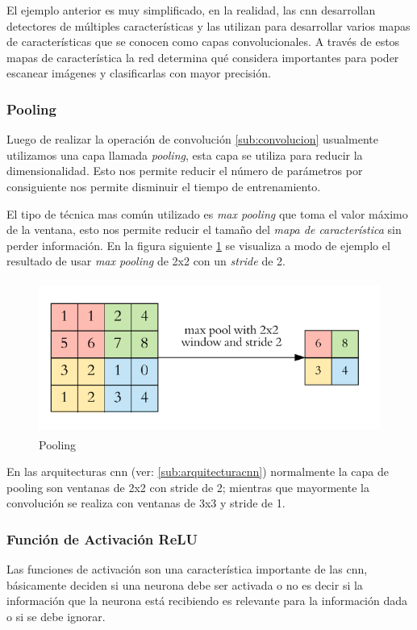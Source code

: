El ejemplo anterior es muy simplificado, en la realidad, las \ac{cnn} desarrollan detectores de múltiples características y las utilizan para desarrollar varios mapas de características que se conocen como capas convolucionales. A través de estos mapas de característica la red determina qué  considera importantes para poder escanear imágenes y clasificarlas con mayor precisión.
\subsubsection{Pooling}\label{sub:pooling}

Luego de realizar la operación de convolución \ref{sub:convolucion} usualmente utilizamos una capa llamada \textit{pooling}, esta capa se utiliza para reducir la dimensionalidad. Esto nos permite reducir el número de parámetros por consiguiente nos permite disminuir el tiempo de entrenamiento.

El tipo de técnica mas común utilizado es \textit{max pooling} que toma el valor máximo de la ventana, esto nos permite reducir el tamaño del \textit{mapa de característica} sin perder información. En la figura siguiente \ref{Fig:Pooling} se visualiza a modo de ejemplo el resultado de usar \textit{max pooling} de 2x2 con un \textit{stride} de 2.

\begin{figure}[H]
 \centering
  \includegraphics[height=5cm,keepaspectratio=true,clip=true]{imagenes/MarcoTeorico/pooling_1.png}
  \caption{Pooling} \label{Fig:Pooling}
\end{figure}

En las arquitecturas \ac{cnn} (ver: \ref{sub:arquitecturacnn}) normalmente la capa de pooling son ventanas de 2x2 con stride de 2; mientras que mayormente la convolución se realiza con ventanas de 3x3 y stride de 1. 

\subsubsection{Función de Activación  ReLU}\label{sub:relu}
Las funciones de activación son una característica  importante de las \ac{cnn}, básicamente deciden si una neurona debe ser activada o no es decir si la información que la neurona está recibiendo es relevante para la información dada o si se debe ignorar.

